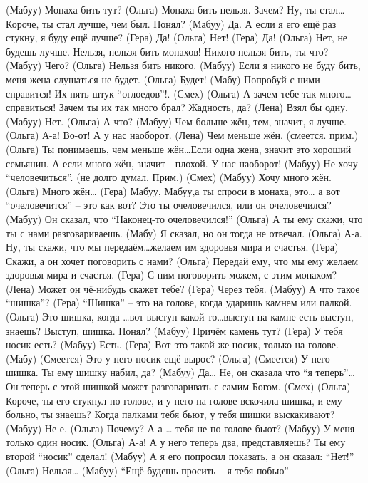  (Мабуу) Монаха бить тут? 
 (Ольга) Монаха бить нельзя. Зачем? Ну, ты стал… Короче,  ты стал лучше, чем был. Понял? 
 (Мабуу) Да. А если я его ещё раз стукну, я буду ещё лучше? 
 (Гера)  Да!
 (Ольга) Нет!
 (Гера)  Да!
 (Ольга) Нет, не будешь лучше.  Нельзя, нельзя бить монахов! Никого нельзя бить, ты что?
 (Мабуу) Чего? 
 (Ольга) Нельзя бить никого.
 (Мабуу) Если я  никого не буду бить,  меня жена слушаться не будет.
 (Ольга) Будет!
 (Мабу)  Попробуй с ними справится! Их пять штук ``оглоедов''!.
 (Смех)
 (Ольга)  А зачем тебе так много…справиться! Зачем ты их так много брал?  Жадность, да?
 (Лена)   Взял бы одну.
 (Мабуу)  Нет. 
 (Ольга)  А что? 
 (Мабуу)  Чем больше жён, тем, значит, я лучше. 
 (Ольга)  А-а! Во-от! А у нас наоборот. 
 (Лена)   Чем меньше жён. (смеется. прим.)
 (Ольга)  Ты понимаешь, чем меньше жён…Если одна жена, значит это хороший семьянин. А если много жён, значит -  плохой.  У нас наоборот! 
 (Мабуу)  Не хочу ``человечиться''. (не долго думал. Прим.)
 (Смех)
 (Мабуу)  Хочу много жён. 
 (Ольга)  Много жён…
 (Гера)   Мабуу, Мабуу,а ты спроси в монаха, это…  а вот ``очеловечится'' – это как вот? Это ты очеловечился, или он очеловечился? 
 (Мабуу) Он сказал, что ``Наконец-то очеловечился!''
 (Ольга) А ты ему скажи, что ты с нами разговариваешь.
 (Мабу)  Я сказал, но он тогда не отвечал.
 (Ольга) А-а. Ну, ты скажи, что мы передаём…желаем им здоровья мира и счастья. 
 (Гера)  Скажи, а он хочет поговорить с нами?
 (Ольга) Передай ему, что мы ему желаем здоровья мира и счастья. 
 (Гера)  С ним поговорить можем, с этим монахом? 
 (Лена)  Может он чё-нибудь скажет тебе?
 (Гера)  Через тебя. 
 (Мабуу) А что такое ``шишка''?
 (Гера)  ``Шишка'' – это на голове, когда ударишь камнем или палкой. 
 (Ольга) Это шишка, когда …вот выступ какой-то…выступ на камне есть выступ, знаешь? Выступ, шишка. Понял?
 (Мабуу)  Причём камень тут? 
 (Гера)   У тебя носик есть?
 (Мабуу)  Есть. 
 (Гера)   Вот это такой же носик, только на голове.
 (Мабу) (Смеется) Это у него носик ещё вырос? 
 (Ольга) (Смеется) У него шишка. Ты ему шишку набил, да? 
 (Мабуу)  Да… Не, он сказала что ``я теперь''…Он теперь с этой шишкой может разговаривать с самим Богом. 
 (Смех)
 (Ольга)  Короче,  ты его стукнул по голове, и у него на голове вскочила шишка, и ему больно, ты знаешь? Когда палками тебя бьют, у тебя шишки выскакивают? 
 (Мабуу) Не-е.
 (Ольга) Почему?  А-а … тебя не по голове бьют?
 (Мабуу) У меня только один носик. 
 (Ольга) А-а! А у него теперь два, представляешь? Ты ему второй ``носик'' сделал! 
 (Мабуу) А я его попросил показать, а он сказал: ``Нет!''
 (Ольга) Нельзя…
 (Мабуу) ``Ещё будешь просить – я тебя побью''
